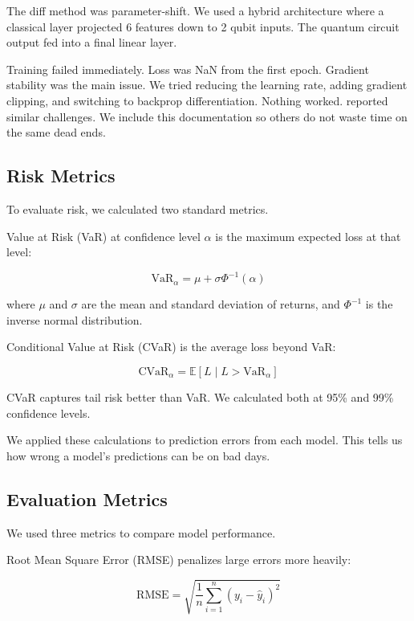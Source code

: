 \documentclass[12pt,a4paper]{article}
\begin{document}
The diff method was parameter-shift. We used a hybrid architecture where a classical layer projected 6 features down to 2 qubit inputs. The quantum circuit output fed into a final linear layer.

Training failed immediately. Loss was NaN from the first epoch. Gradient stability was the main issue. We tried reducing the learning rate, adding gradient clipping, and switching to backprop differentiation. Nothing worked. \citet{chen2025} reported similar challenges. We include this documentation so others do not waste time on the same dead ends.

\subsection{Risk Metrics}
To evaluate risk, we calculated two standard metrics.

Value at Risk (VaR) at confidence level $\alpha$ is the maximum expected loss at that level:

\begin{equation}
\text{VaR}_{\alpha} = \mu + \sigma \Phi^{-1}(\alpha)
\end{equation}

where $\mu$ and $\sigma$ are the mean and standard deviation of returns, and $\Phi^{-1}$ is the inverse normal distribution.

Conditional Value at Risk (CVaR) is the average loss beyond VaR:

\begin{equation}
\text{CVaR}_{\alpha} = \mathbb{E}[L \mid L > \text{VaR}_{\alpha}]
\end{equation}

CVaR captures tail risk better than VaR. We calculated both at 95\% and 99\% confidence levels.

We applied these calculations to prediction errors from each model. This tells us how wrong a model's predictions can be on bad days.

\subsection{Evaluation Metrics}
We used three metrics to compare model performance.

Root Mean Square Error (RMSE) penalizes large errors more heavily:

\begin{equation}
\text{RMSE} = \sqrt{\frac{1}{n} \sum_{i=1}^{n} (y_i - \hat{y}_i)^2}
\end{equation}
\end{document}
